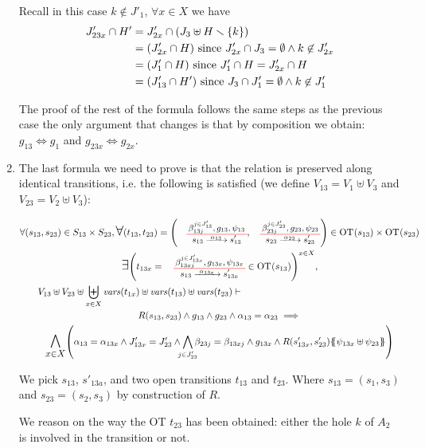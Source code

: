 \documentclass[runningheads]{llncs}
\begin{document}
\begin{enumerate}
Recall in this case $k \notin J'_1$, $\forall x \in X$ we have
\begin{align*}		
J'_{23x} \cap H' & = J'_{2x}  \cap {\left(J_3 \uplus H \smallsetminus{\left\{k\right\}}\right)} \\
& = {\left(J'_{2x}\cap H \right)} \text{ since } J'_{2x}\cap J_3=\emptyset \land k\not\in J'_{2x} \\
& = {\left(J'_1\cap H \right)} \text{ since } J'_1 \cap H = J'_{2x} \cap H\\
& = {\left(J'_{13}\cap H' \right)} \text{ since } J_3\cap J'_1=\emptyset \land k\not\in J_1'
\end{align*}

The proof of the rest of the formula follows the same steps as the previous case the only argument that changes is that by composition we obtain:  $g_{13} \Leftrightarrow g_1$ and
$g_{23x}  \Leftrightarrow g_{2x}$.\\


\item The last formula we need to prove is that the relation is preserved along identical transitions, i.e. the following is satisfied (we define $V_{13} = V_1 \uplus V_3$ and $ V_{23} = V_2\uplus V_3$):

\begin{multline*}
\forall \mpar{s_{13}, s_{23}} \in S_{13} \times S_{23}, \bigsymb{\forall} \mpar{t_{13}, t_{23}} = \mpar{\OTx{13}{}{13}{13}, \OTx{23}{}{23}{23}} \in \fOT{s_{13}} \times \fOT{s_{23}} \\ 
\bigsymb{\bigexists} 
\mpar{t_{13x} = \OTx{13}{x}{13x}{13x} \in \fOT{s_{13}}}^{x \in X},\\
 V_{13} \uplus V_{23} \uplus  \biguplus_{x\in X}\fvars{t_{1x}}  \uplus \fvars{t_{13}} \uplus \fvars{t_{23}} 
\vdash \hspace{6cm}\\  R\mpar{s_{13}, s_{23}} \wedge 	g_{13} \wedge g_{23} \wedge \alpha_{13} = \alpha_{23} 
\implies \\
\bigsymb{\bigwedge_{x\in X}}
\mpar{
 \alpha_{13}=\alpha_{1 3x} \land
J'_{13x}  = J'_{23}  \land \bigwedge_\subbox{j \in  J'_{23}} \beta_{23j} = \beta_{13xj}\land g_{1 3x} \land
 R\mpar{s'_{1 3x}, s'_{23}}\psubst{\psi_{1 3x} \uplus \psi_{23}}}
\end{multline*}

We pick $s_{13}$, $s'_{13a}$, and two open transitions $t_{13}$ and $t_{23}$.
Where $s_{13}=(s_1,s_3)$ and $s_{23}=(s_2,s_3)$ by construction of $R$.


We reason on the way the OT $t_{23}$ has been obtained: either the hole $k$ of $A_2$ is involved in the transition or not.


\end{enumerate}
\end{document}
